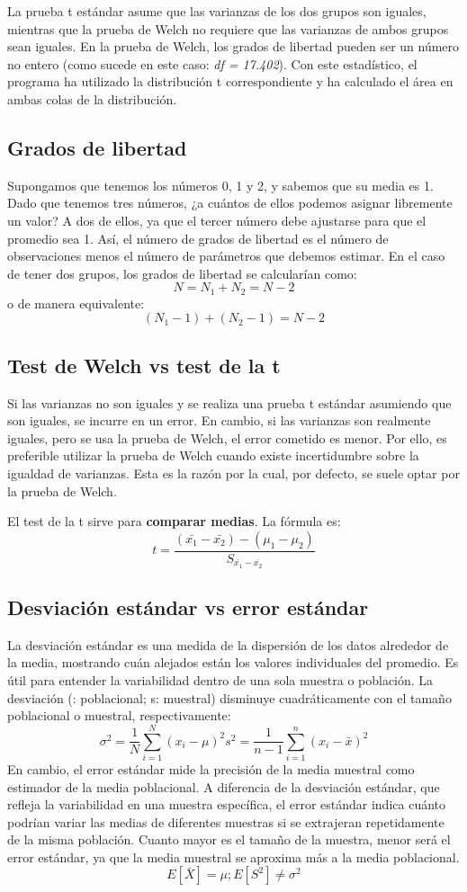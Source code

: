 \documentclass{config/apuntes}\usepackage[]{graphicx}\usepackage[]{xcolor}
\begin{document}
La prueba t estándar asume que las varianzas de los dos grupos son iguales, mientras que la prueba de Welch no requiere que las varianzas de ambos grupos sean iguales. En la prueba de Welch, los grados de libertad pueden ser un número no entero (como sucede en este caso: \textit{df = 17.402}). Con este estadístico, el programa ha utilizado la distribución t correspondiente y ha calculado el área en ambas colas de la distribución.

\subsection{Grados de libertad}
Supongamos que tenemos los números 0, 1 y 2, y sabemos que su media es 1. Dado que tenemos tres números, ¿a cuántos de ellos podemos asignar libremente un valor? A dos de ellos, ya que el tercer número debe ajustarse para que el promedio sea 1. Así, el número de grados de libertad es el número de observaciones menos el número de parámetros que debemos estimar. En el caso de tener dos grupos, los grados de libertad se calcularían como:
$$ N = N_1 + N_2 = N - 2$$
o de manera equivalente:
$$(N_1 - 1) + (N_2 - 1) = N - 2$$

\subsection{Test de Welch vs test de la t}
Si las varianzas no son iguales y se realiza una prueba t estándar asumiendo que son iguales, se incurre en un error. En cambio, si las varianzas son realmente iguales, pero se usa la prueba de Welch, el error cometido es menor. Por ello, es preferible utilizar la prueba de Welch cuando existe incertidumbre sobre la igualdad de varianzas. Esta es la razón por la cual, por defecto, se suele optar por la prueba de Welch.


El test de la t sirve para \textbf{comparar medias}. La fórmula es:
\[
t = \frac{(\bar{x_1} - \bar{x_2})-(\mu_1 - \mu_2)}{S_{\bar{x_1}-\bar{x_2}}}
\]

\subsection{Desviación estándar vs error estándar}
La desviación estándar es una medida de la dispersión de los datos alrededor de la media, mostrando cuán alejados están los valores individuales del promedio. Es útil para entender la variabilidad dentro de una sola muestra o población. La desviación (\sigma: poblacional; s: muestral) disminuye cuadráticamente con el tamaño poblacional o muestral, respectivamente:
\[
\sigma^2 = \frac{1}{N} \sum_{i=1}^{N} (x_i - \mu)^2      s^2 = \frac{1}{n - 1} \sum_{i=1}^{n} (x_i - \bar{x})^2
\]
En cambio, el error estándar mide la precisión de la media muestral como estimador de la media poblacional. A diferencia de la desviación estándar, que refleja la variabilidad en una muestra específica, el error estándar indica cuánto podrían variar las medias de diferentes muestras si se extrajeran repetidamente de la misma población. Cuanto mayor es el tamaño de la muestra, menor será el error estándar, ya que la media muestral se aproxima más a la media poblacional.
$$ E[\bar{X}] = \mu ;      E[S^2] \neq \sigma^2$$
\end{document}
